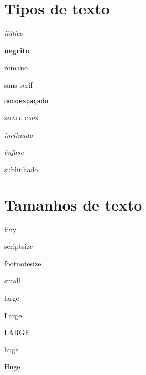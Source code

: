 \documentclass[12pt, a4paper]{article}
\begin{document}
\section{Tipos de texto}

\textit{itálico}

\textbf{negrito}

\textrm{romano}

\textsf{sans serif}

\texttt{monoespaçado}

\textsc{small caps}

\textsl{inclinado}

\emph{ênfase}

\underline{sublinhado}

\section{Tamanhos de texto}

{\tiny tiny}

{\scriptsize scriptsize}

{\footnotesize footnotesize}

{\small small}

{\large large}

{\Large Large}

{\LARGE LARGE}

{\huge huge}

{\Huge Huge}
\end{document}
